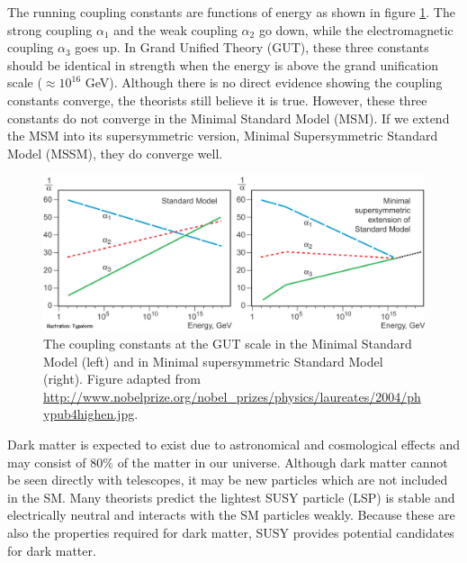 \documentclass[12pt]{report}
\begin{document}
The running coupling constants are functions of energy as shown in figure \ref{fig: running_coupling_constant}.
The strong coupling $\alpha_{1}$ and the weak coupling $\alpha_{2}$ go down, while the electromagnetic coupling $\alpha_{3}$ goes up.
In Grand Unified Theory (GUT), these three constants should be identical in strength when the energy is above the grand unification scale ($\approx 10^{16}$ GeV).
Although there is no direct evidence showing the coupling constants converge, the theorists still believe it is true.
However, these three constants do not converge in the Minimal Standard Model (MSM). 
If we extend the MSM into its supersymmetric version, Minimal Supersymmetric Standard Model (MSSM), they do converge well.
\begin{figure}[htbp]
\begin{center}
\includegraphics[scale=0.75]{figures/phypub4highen.pdf}
\caption{The coupling constants at the GUT scale in the Minimal Standard Model (left) and in Minimal supersymmetric Standard Model (right).
Figure adapted from \url{http://www.nobelprize.org/nobel_prizes/physics/laureates/2004/phypub4highen.jpg}.}
\label{fig: running_coupling_constant}
\end{center}
\end{figure}

Dark matter is expected to exist due to astronomical and cosmological effects and may consist of $80\%$ of the matter in our universe.
Although dark matter cannot be seen directly with telescopes, it may be new particles which are not included in the SM.
Many theorists predict the lightest SUSY particle (LSP) is stable and electrically neutral and interacts with the SM particles weakly.
Because these are also the properties required for dark matter, SUSY provides potential candidates for dark matter.
\end{document}
